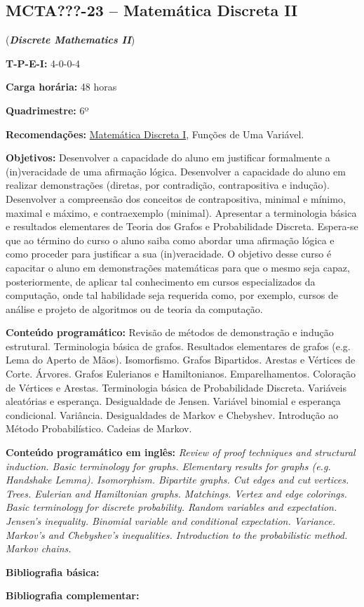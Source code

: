 \documentclass[class=article, crop=false]{standalone}
\begin{document}
\subsection*{MCTA???-23 -- Matemática Discreta II}
\label{disc:mdII}

(\textbf{\textit{Discrete Mathematics II}})

\begin{center}
	\begin{minipage}{0.85\textwidth}
		\textbf{T-P-E-I:} 4-0-0-4

		\textbf{Carga horária:} 48 horas

		\textbf{Quadrimestre:} 6º

		\textbf{Recomendações:} 
        \hyperref[disc:mdI]{Matemática Discreta I},
        Funções de Uma Variável.

	\end{minipage}
\end{center}

\textbf{Objetivos:}
Desenvolver a capacidade do aluno em justificar formalmente a (in)veracidade de
uma afirmação lógica.
Desenvolver a capacidade do aluno em realizar demonstrações (diretas, por
contradição, contrapositiva e indução).
Desenvolver a compreensão dos conceitos de contrapositiva, minimal e mínimo,
maximal e máximo, e contraexemplo (minimal).
Apresentar a terminologia básica e resultados elementares de Teoria dos Grafos
e Probabilidade Discreta.
Espera-se que ao término do curso o aluno saiba como abordar uma afirmação
lógica e como proceder para justificar a sua (in)veracidade.
O objetivo desse curso é capacitar o aluno em demonstrações matemáticas para
que o mesmo seja capaz, posteriormente, de aplicar tal conhecimento em cursos
especializados da computação, onde tal habilidade seja requerida como, por
exemplo, cursos de análise e projeto de algoritmos ou de teoria da computação.

\textbf{Conteúdo programático:}
Revisão de métodos de demonstração e indução estrutural.
Terminologia básica de grafos.
Resultados elementares de grafos (e.g. Lema do Aperto de Mãos).
Isomorfismo.
Grafos Bipartidos.
Arestas e Vértices de Corte.
Árvores.
Grafos Eulerianos e Hamiltonianos.
Emparelhamentos.
Coloração de Vértices e Arestas.
Terminologia básica de Probabilidade Discreta.
Variáveis aleatórias e esperança.
Desigualdade de Jensen.
Variável binomial e esperança condicional.
Variância.
Desigualdades de Markov e Chebyshev.
Introdução ao Método Probabilístico.
Cadeias de Markov.

\textbf{Conteúdo programático em inglês:}
\textit{Review of proof techniques and structural induction.
Basic terminology for graphs.
Elementary results for graphs (e.g. Handshake Lemma).
Isomorphism.
Bipartite graphs.
Cut edges and cut vertices.
Trees.
Eulerian and Hamiltonian graphs.
Matchings.
Vertex and edge colorings.
Basic terminology for discrete probability.
Random variables and expectation.
Jensen's inequality.
Binomial variable and conditional expectation.
Variance.
Markov's and Chebyshev's inequalities.
Introduction to the probabilistic method.
Markov chains.}

\newrefsection
\textbf{Bibliografia básica:}
\nocite{2008-bondy-murty,2012-rosen-etal,2017-mitzenmacher-upfal}
\printbibliography

\newrefsection
\textbf{Bibliografia complementar:}
\nocite{2018-diestel,1996-west,2008-ash,2010-ross}
\printbibliography
\end{document}
